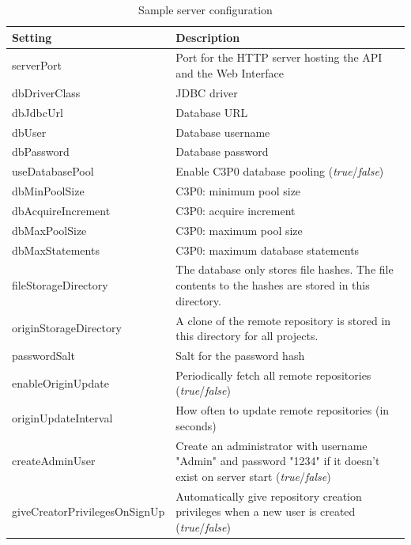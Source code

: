 \begin{table}

    \scriptsize
    \begin{tabularx}{\textwidth}{ | l | X | }
    \hline
Setting & Description \\ \hline
serverPort & Port for the HTTP server hosting the API and the Web Interface \\ \hline
dbDriverClass & JDBC driver \\ \hline
dbJdbcUrl & Database URL \\ \hline
dbUser & Database username \\ \hline
dbPassword & Database password \\ \hline
useDatabasePool & Enable C3P0 database pooling (\emph{true}/\emph{false}) \\ \hline
dbMinPoolSize & C3P0: minimum pool size \\ \hline
dbAcquireIncrement & C3P0: acquire increment \\ \hline
dbMaxPoolSize & C3P0: maximum pool size \\ \hline
dbMaxStatements & C3P0: maximum database statements \\ \hline
fileStorageDirectory & The database only stores file hashes. The file contents to the hashes are stored in this directory. \\ \hline
originStorageDirectory & A clone of the remote repository is stored in this directory for all projects. \\ \hline
passwordSalt & Salt for the password hash \\ \hline
enableOriginUpdate & Periodically fetch all remote repositories (\emph{true}/\emph{false}) \\ \hline
originUpdateInterval & How often to update remote repositories (in seconds) \\ \hline
createAdminUser & Create an administrator with username "Admin" and password "1234" if it doesn't exist on server start (\emph{true}/\emph{false})  \\ \hline
giveCreatorPrivilegesOnSignUp & Automatically give repository creation privileges when a new user is created (\emph{true}/\emph{false})  \\ \hline
    \end{tabularx}
    
    \centering
    
  \caption{Sample server configuration}
  \label{table:serverconfigtable}
  
    \end{table}
    



